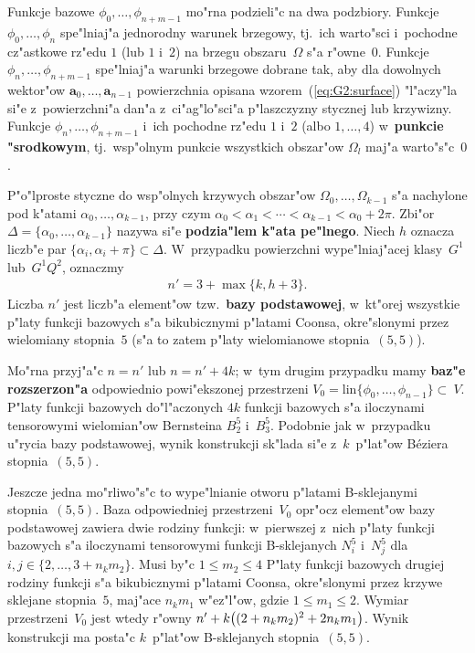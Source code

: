 \begin{sloppypar}
Funkcje bazowe $\phi_0,\ldots,\phi_{n+m-1}$ mo"rna podzieli"c na dwa
podzbiory. Funkcje $\phi_0,\ldots,\phi_n$ spe"lniaj"a jednorodny warunek
brzegowy, tj.\ ich warto"sci i~pochodne cz"astkowe rz"edu $1$ (lub $1$ i~$2$)
na brzegu obszaru~$\varOmega$ s"a r"owne~$0$. Funkcje
$\phi_n,\ldots,\phi_{n+m-1}$ spe"lniaj"a warunki brzegowe dobrane tak, aby
dla dowolnych wektor"ow $\bm{a}_0,\ldots,\bm{a}_{n-1}$ powierzchnia opisana
wzorem~(\ref{eq:G2:surface}) "l"aczy"la si"e z~powierzchni"a dan"a
z~ci"ag"lo"sci"a p"laszczyzny stycznej lub krzywizny.
Funkcje $\phi_n,\ldots,\phi_{n+m-1}$ i~ich
pochodne rz"edu $1$ i~$2$ (albo $1,\ldots,4$) w~\textbf{punkcie "srodkowym},
tj.\ wsp"olnym punkcie wszystkich obszar"ow $\varOmega_l$ maj"a warto"s"c~$0$.%
\end{sloppypar}

P"o"lproste styczne do wsp"olnych krzywych obszar"ow
$\varOmega_0,\ldots,\varOmega_{k-1}$ s"a nachylone pod k"atami
$\alpha_0,\ldots,\alpha_{k-1}$, przy czym
$\alpha_0<\alpha_1<\cdots<\alpha_{k-1}<\alpha_0+2\pi$. Zbi"or
$\varDelta=\{\alpha_0,\ldots,\alpha_{k-1}\}$ nazywa si"e \textbf{podzia"lem
k"ata pe"lnego}. Niech $h$ oznacza liczb"e par
$\{\alpha_i,\alpha_i+\pi\}\subset\varDelta$. W~przypadku powierzchni wype"lniaj"acej
klasy~$G^1$ lub~$G^1Q^2$, oznaczmy
\begin{align*}
  n' = 3 + \max\{k,h+3\}.
\end{align*}
Liczba $n'$ jest liczb"a element"ow tzw.\ \textbf{bazy podstawowej}, w~kt"orej
wszystkie p"laty funkcji bazowych s"a bikubicznymi p"latami Coonsa,
okre"slonymi przez wielomiany stopnia~$5$ (s"a to zatem p"laty wielomianowe
stopnia~$(5,5)$).

Mo"rna przyj"a"c $n=n'$ lub $n=n'+4k$; w~tym drugim przypadku mamy \textbf{baz"e
rozszerzon"a} odpowiednio powi"ekszonej przestrzeni
$V_0=\mathord{\mathrm{lin}}\{\phi_0,\ldots,\phi_{n-1}\}\subset~V$. P"laty funkcji
bazowych do"l"aczonych $4k$ funkcji bazowych s"a iloczynami tensorowymi
wielomian"ow Bernsteina $B^5_2$ i~$B^5_3$. Podobnie jak w~przypadku
u"rycia bazy podstawowej, wynik konstrukcji sk"lada si"e z~$k$~p"lat"ow
B\'{e}ziera stopnia~$(5,5)$.

Jeszcze jedna mo"rliwo"s"c to wype"lnianie otworu p"latami B-sklejanymi
stopnia~$(5,5)$. Baza odpowiedniej przestrzeni~$V_0$ opr"ocz element"ow
bazy podstawowej zawiera dwie rodziny funkcji: w~pierwszej z~nich
p"laty funkcji bazowych s"a iloczynami tensorowymi funkcji B-sklejanych
$N^5_i$ i~$N^5_j$ dla $i,j\in\{2,\ldots,3+n_km_2\}$. Musi by"c $1\leq m_2\leq 4$
P"laty funkcji bazowych drugiej rodziny funkcji s"a bikubicznymi p"latami
Coonsa, okre"slonymi przez krzywe sklejane stopnia~$5$, maj"ace $n_km_1$
w"ez"l"ow, gdzie $1\leq m_1\leq 2$. Wymiar przestrzeni~$V_0$ jest wtedy r"owny
$n'+k\bigl((2+n_km_2)^2+2n_km_1\bigr)$. Wynik konstrukcji ma posta"c $k$~p"lat"ow
B-sklejanych stopnia~$(5,5)$.

